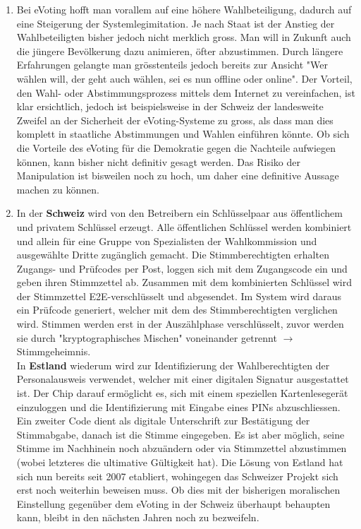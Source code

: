 \documentclass[a4paper]{article}
\begin{document}
	\begin{enumerate}
		\item Bei eVoting hofft man vorallem auf eine höhere Wahlbeteiligung, dadurch auf eine Steigerung der Systemlegimitation. Je nach Staat ist der Anstieg der Wahlbeteiligten bisher jedoch nicht merklich gross. Man will in Zukunft auch die jüngere Bevölkerung dazu animieren, öfter abzustimmen. Durch längere Erfahrungen gelangte man gröss\-tenteils jedoch bereits zur Ansicht "Wer wählen will, der geht auch wählen, sei es nun offline oder online". Der Vorteil, den Wahl- oder Abstimmungsprozess mittels dem Internet zu vereinfachen, ist klar ersichtlich, jedoch ist beispielsweise in der Schweiz der landesweite Zweifel an der Sicherheit der eVoting-Systeme zu gross, als dass man dies komplett in staatliche Abstimmungen und Wahlen einführen könnte. Ob sich die Vorteile des eVoting für die Demokratie gegen die Nachteile aufwiegen können, kann bisher nicht definitiv gesagt werden. Das Risiko der Manipulation ist bisweilen noch zu hoch, um daher eine definitive Aussage machen zu können. 
		\item In der \textbf{Schweiz} wird von den Betreibern ein Schlüsselpaar aus öffentlichem und privatem Schlüssel erzeugt. Alle öffentlichen Schlüssel werden kombiniert und allein für eine Gruppe von Spezialisten der Wahlkommission und ausgewählte Dritte zugänglich gemacht. Die Stimmberechtigten erhalten Zugangs- und Prüfcodes per Post, loggen sich mit dem Zugangscode ein und geben ihren Stimmzettel ab. Zusammen mit dem kombinierten Schlüssel wird der Stimmzettel E2E-verschlüsselt und abgesendet. Im System wird daraus ein Prüfcode generiert, welcher mit dem des Stimmberechtigten verglichen wird. Stimmen werden erst in der Auszählphase verschlüsselt, zuvor werden sie durch "kryptographisches Mischen" voneinander getrennt $\rightarrow$  Stimmgeheimnis.\\
		In \textbf{Estland} wiederum wird zur Identifizierung der Wahlberechtigten der Personalausweis verwendet, welcher mit einer digitalen Signatur ausgestattet ist. Der Chip darauf ermöglicht es, sich mit einem speziellen Kartenlesegerät einzuloggen und die Identifizierung mit Eingabe eines PINs abzuschliessen. Ein zweiter Code dient als digitale Unterschrift zur Bestätigung der Stimmabgabe, danach ist die Stimme eingegeben. Es ist aber möglich, seine Stimme im Nachhinein noch abzuändern oder via Stimmzettel abzustimmen (wobei letzteres die ultimative Gültigkeit hat). Die Lösung von Estland hat sich nun bereits seit 2007 etabliert, wohingegen das Schweizer Projekt sich erst noch weiterhin beweisen muss. Ob dies mit der bisherigen moralischen Einstellung gegenüber dem eVoting in der Schweiz überhaupt behaupten kann, bleibt in den nächsten Jahren noch zu bezweifeln. 
	\end{enumerate}
	
\end{document}
